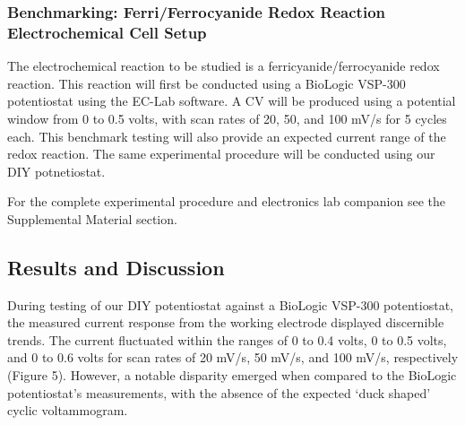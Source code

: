 \documentclass{article}
\begin{document}
\subsubsection*{Benchmarking: Ferri/Ferrocyanide Redox Reaction Electrochemical Cell Setup}

The electrochemical reaction to be studied is a ferricyanide/ferrocyanide redox reaction. This reaction will first be conducted using a BioLogic VSP-300 potentiostat using the EC-Lab software. A CV will be produced using a potential window from 0 to 0.5 volts, with scan rates of 20, 50, and 100 mV/s for 5 cycles each. This benchmark testing will also provide an expected current range of the redox reaction. The same experimental procedure will be conducted using our DIY potnetiostat.

For the complete experimental procedure and electronics lab companion see the Supplemental Material section.


\subsection*{Results and Discussion}

During testing of our DIY potentiostat against a BioLogic VSP-300 potentiostat, the measured current response from the working electrode displayed discernible trends. The current fluctuated within the ranges of 0 to 0.4 volts, 0 to 0.5 volts, and 0 to 0.6 volts for scan rates of 20 mV/s, 50 mV/s, and 100 mV/s, respectively (Figure 5). However, a notable disparity emerged when compared to the BioLogic potentiostat's measurements, with the absence of the expected `duck shaped' cyclic voltammogram.
\end{document}
